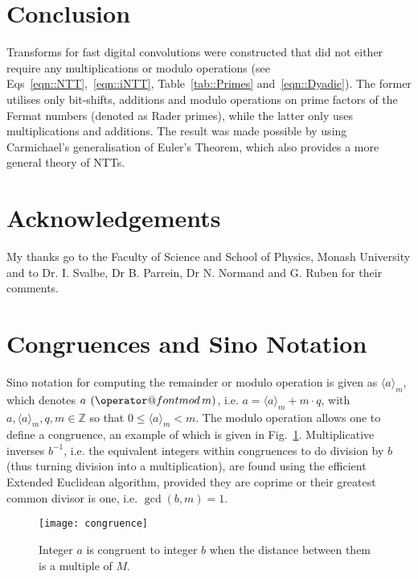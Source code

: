 \documentclass[twocolumn]{IEEEtran}
\makeatletter
\def\imod#1{\allowbreak\mkern10mu({\operator@font mod}\,#1)}
\newcommand{\modulusSymbol}{m}
\newcommand{\eqnsTag}{Eqs}
\newcommand{\figTag}{Fig.}
\newcommand{\tabTag}{Table}
\makeatother
\begin{document}
\section*{Conclusion}\label{sec::Conclusion}
Transforms for fast digital convolutions were constructed that did not either require any multiplications or modulo operations (see \eqnsTag~\eqref{eqn::NTT},~\eqref{eqn::iNTT}, \tabTag~\ref{tab::Primes} and~\eqref{eqn::Dyadic}). The former utilises only bit-shifts, additions and modulo operations on prime factors of the Fermat numbers (denoted as Rader primes), while the latter only uses multiplications and additions. The result was made possible by using Carmichael's generalisation of Euler's Theorem, which also provides a more general theory of \aclp{NTT}.

\section*{Acknowledgements}
My thanks go to the Faculty of Science and School of Physics, Monash University and to Dr. I. Svalbe, Dr B. Parrein, Dr N. Normand and G. Ruben for their comments.

\appendices
\section{Congruences and Sino Notation}\label{sec::Sino}
Sino notation for computing the remainder or modulo operation is given as $\langle a \rangle_\modulusSymbol$, which denotes $a \!\imod \modulusSymbol$, i.e. $a = \langle a \rangle_\modulusSymbol + \modulusSymbol\cdot q$, with $a, \langle a \rangle_\modulusSymbol, q, \modulusSymbol \in \mathbb{Z}$ so that $0 \leqslant \langle a \rangle_\modulusSymbol < \modulusSymbol$. The modulo operation allows one to define a congruence, an example of which is given in \figTag~\ref{fig::Congruence}. Multiplicative inverses $b^{-1}$, i.e. the equivalent integers within congruences to do division by $b$ (thus turning division into a multiplication), are found using the efficient Extended Euclidean algorithm, provided they are coprime or their greatest common divisor is one, i.e. $\gcd(b,m)=1$.
\begin{figure}[htbp]
 \centering
 \texttt{[image: congruence]} \caption{Integer $a$ is congruent to integer $b$ when the distance between them is a multiple of $M$.}
 \label{fig::Congruence}
\end{figure}
\end{document}
